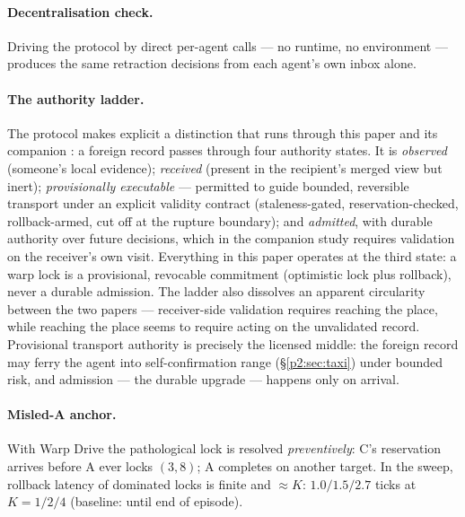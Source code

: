 \documentclass{article}
\begin{document}
\paragraph{Decentralisation check.} Driving the protocol by direct
per-agent calls --- no runtime, no environment --- produces the same
retraction decisions from each agent's own inbox alone.

\paragraph{The authority ladder.} The protocol makes explicit a
distinction that runs through this paper and its companion
\citep{songlines3}: a foreign record passes through four authority
states. It is \emph{observed} (someone's local evidence);
\emph{received} (present in the recipient's merged view but inert);
\emph{provisionally executable} --- permitted to guide bounded,
reversible transport under an explicit validity contract
(staleness-gated, reservation-checked, rollback-armed, cut off at the
rupture boundary); and \emph{admitted}, with durable authority over
future decisions, which in the companion study requires validation on
the receiver's own visit. Everything in this paper operates at the
third state: a warp lock is a provisional, revocable commitment
(optimistic lock plus rollback), never a durable admission. The
ladder also dissolves an apparent circularity between the two papers
--- receiver-side validation requires reaching the place, while
reaching the place seems to require acting on the unvalidated record.
Provisional transport authority is precisely the licensed middle: the
foreign record may ferry the agent into self-confirmation range
(\S\ref{p2:sec:taxi}) under bounded risk, and admission --- the
durable upgrade --- happens only on arrival.

\paragraph{Misled-A anchor.} With Warp Drive the pathological lock is
resolved \emph{preventively}: C's reservation arrives before A ever
locks $(3,8)$; A completes on another target. In the sweep, rollback
latency of dominated locks is finite and ${\approx}K$: $1.0/1.5/2.7$
ticks at $K{=}1/2/4$ (baseline: until end of episode).
\end{document}
